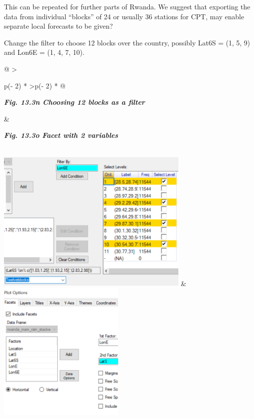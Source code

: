 \documentclass[
  letterpaper,
  DIV=11,
  numbers=noendperiod]{scrreprt}
\begin{document}
This can be repeated for further parts of Rwanda. We suggest that
exporting the data from individual ``blocks'' of 24 or usually 36
stations for CPT, may enable separate local forecasts to be given?

Change the filter to choose 12 blocks over the country, possibly Lat6S =
(1, 5, 9) and Lon6E = (1, 4, 7, 10).

\begin{longtable}[]{@{}
  >{\raggedright\arraybackslash}p{(\columnwidth - 2\tabcolsep) * }
  >{\centering\arraybackslash}p{(\columnwidth - 2\tabcolsep) * }@{}}
\toprule\noalign{}
\begin{minipage}[b]{\linewidth}\raggedright
\textbf{\emph{Fig. 13.3n Choosing 12 blocks as a filter}}
\end{minipage} & \begin{minipage}[b]{\linewidth}\centering
\textbf{\emph{Fig. 13.3o Facet with 2 variables}}
\end{minipage} \\
\midrule\noalign{}
\endhead
\bottomrule\noalign{}
\endlastfoot
\includegraphics[width=3.68059in,height=2.71639in]{figures/Fig13.3n.png}
&
\includegraphics[width=2.40219in,height=2.68106in]{figures/Fig13.3o.png} \\
\end{longtable}
\end{document}
